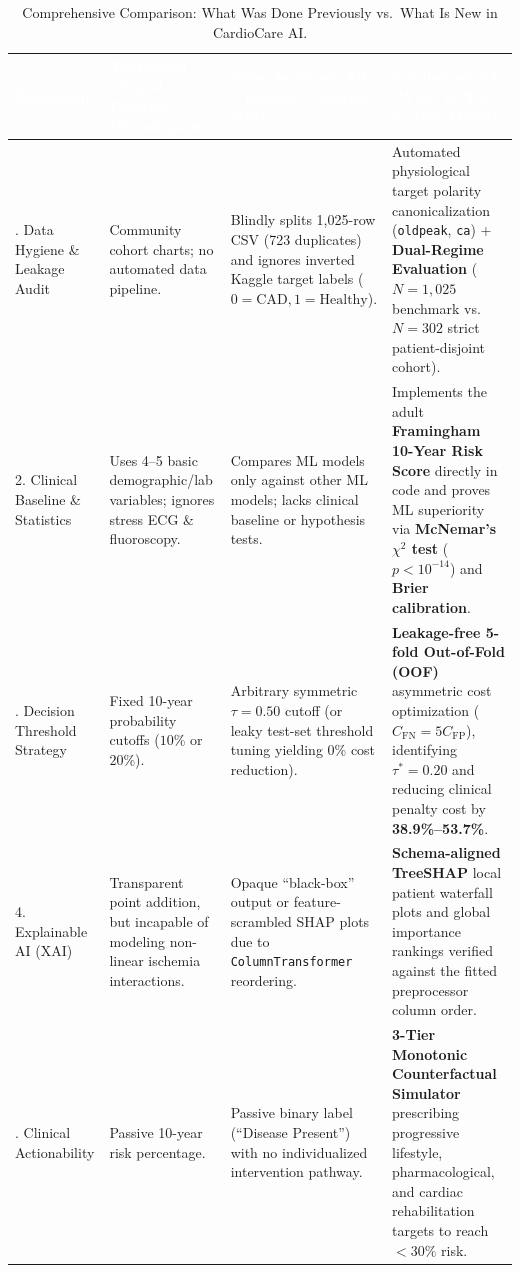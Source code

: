 \documentclass[12pt,a4paper]{report}
\begin{document}
\begin{table}[htbp]
\centering
\caption{Comprehensive Comparison: What Was Done Previously vs.\ What Is New in CardioCare AI.}
\label{tab:prior_vs_new}
\footnotesize
\renewcommand{\arraystretch}{1.3}
\begin{tabularx}{\textwidth}{>{\bfseries\raggedright\arraybackslash}p{2.7cm} >{\raggedright\arraybackslash}X >{\raggedright\arraybackslash}X >{\raggedright\arraybackslash}X}
\toprule
\rowcolor{navyblue}
\textcolor{white}{Dimension} & \textcolor{white}{\textbf{Traditional Clinical Practice (Framingham)}} & \textcolor{white}{\textbf{Prior Academic ML / Baseline Capstone Work}} & \textcolor{white}{\textbf{CardioCare AI (What Is New in This Thesis)}} \\
\midrule
1. Data Hygiene \& Leakage Audit & Community cohort charts; no automated data pipeline. & Blindly splits 1,025-row CSV (723 duplicates) and ignores inverted Kaggle target labels ($0=\text{CAD}, 1=\text{Healthy}$). & Automated physiological target polarity canonicalization (\texttt{oldpeak}, \texttt{ca}) + \textbf{Dual-Regime Evaluation} ($N=1,025$ benchmark vs.\ $N=302$ strict patient-disjoint cohort). \\
\rowcolor{rowgray}
2. Clinical Baseline \& Statistics & Uses 4--5 basic demographic/lab variables; ignores stress ECG \& fluoroscopy. & Compares ML models only against other ML models; lacks clinical baseline or hypothesis tests. & Implements the adult \textbf{Framingham 10-Year Risk Score} directly in code and proves ML superiority via \textbf{McNemar's $\chi^2$ test} ($p < 10^{-14}$) and \textbf{Brier calibration}. \\
3. Decision Threshold Strategy & Fixed 10-year probability cutoffs ($10\%$ or $20\%$). & Arbitrary symmetric $\tau = 0.50$ cutoff (or leaky test-set threshold tuning yielding $0\%$ cost reduction). & \textbf{Leakage-free 5-fold Out-of-Fold (OOF)} asymmetric cost optimization ($C_{\text{FN}} = 5 C_{\text{FP}}$), identifying $\tau^* = 0.20$ and reducing clinical penalty cost by \textbf{38.9\%--53.7\%}. \\
\rowcolor{rowgray}
4. Explainable AI (XAI) & Transparent point addition, but incapable of modeling non-linear ischemia interactions. & Opaque ``black-box'' output or feature-scrambled SHAP plots due to \texttt{ColumnTransformer} reordering. & \textbf{Schema-aligned TreeSHAP} local patient waterfall plots and global importance rankings verified against the fitted preprocessor column order. \\
5. Clinical Actionability & Passive 10-year risk percentage. & Passive binary label (``Disease Present'') with no individualized intervention pathway. & \textbf{3-Tier Monotonic Counterfactual Simulator} prescribing progressive lifestyle, pharmacological, and cardiac rehabilitation targets to reach $<30\%$ risk. \\
\bottomrule
\end{tabularx}
\end{table}
\end{document}
